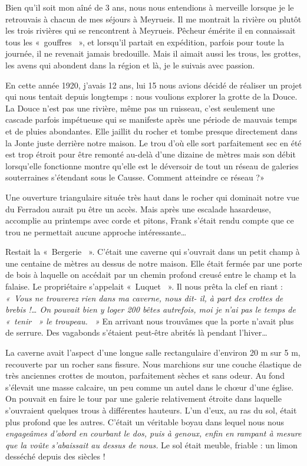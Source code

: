 Bien qu’il soit mon aîné de 3 ans, nous nous entendions à merveille lorsque je le retrouvais à
chacun de mes séjours à Meyrueis. Il me montrait la rivière ou plutôt les trois rivières qui se
rencontrent à Meyrueis.
Pêcheur émérite il en connaissait tous les «~gouffres ~», et lorsqu’il partait en expédition,
parfois pour toute la journée, il ne revenait jamais bredouille. Mais il aimait aussi les trous, les
grottes, les avens qui abondent dans la région et là, je le suivais avec passion.

En cette année 1920, j’avais 12 ans, lui 15 nous avions décidé de réaliser un projet qui nous
tentait depuis longtemps : nous voulions explorer la grotte de la Douce. La Douce n’est pas
une rivière, même pas un ruisseau, c’est seulement une cascade parfois impétueuse qui se
manifeste après une période de mauvais temps et de pluies abondantes. Elle jaillit du rocher et
tombe presque directement dans la Jonte juste derrière notre maison. Le trou d’où elle sort
parfaitement sec en été est trop étroit pour être remonté au-delà d’une dizaine de mètres mais
son débit lorsqu’elle fonctionne montre qu’elle est le déversoir de tout un réseau de galeries
souterraines s’étendant sous le Causse. Comment atteindre ce réseau ?»

Une ouverture triangulaire située très haut dans le rocher qui dominait notre vue du Ferradou
aurait pu être un accès. Mais après une escalade hasardeuse, accomplie au printemps avec
corde et pitons, Frank s’était rendu compte que ce trou ne permettait aucune approche
intéressante…

Restait la «~Bergerie ~». C’était une caverne qui s’ouvrait dans un petit champ à une centaine
de mètres au dessus de notre maison. Elle était fermée par une porte de bois à laquelle on
accédait par un chemin profond creusé entre le champ et la falaise. Le propriétaire s’appelait
«~Luquet ~». Il nous prêta la clef en riant : \textit{«~Vous ne trouverez rien dans ma caverne, nous dit-
il, à part des crottes de brebis !… On pouvait bien y loger 200 bêtes autrefois, moi je n’ai pas
le temps de «~tenir ~» le troupeau. ~»} En arrivant nous trouvâmes que la porte n’avait plus de
serrure. Des vagabonds s’étaient peut-être abrités là pendant l’hiver…

La caverne avait l’aspect d’une longue salle rectangulaire d’environ 20 m sur 5 m, recouverte par
un rocher sans fissure. Nous marchions sur une couche élastique de très anciennes crottes de
mouton, parfaitement sèches et sans odeur. Au fond s’élevait une masse calcaire, un peu
comme un autel dans le chœur d’une église.
On pouvait en faire le tour par une galerie relativement étroite dans laquelle s’ouvraient
quelques trous à différentes hauteurs. L’un d’eux, au ras du sol, était plus profond que les
autres. C’était un véritable boyau dans lequel nous nous \textit{engageâmes d’abord en courbant le dos,
puis à genoux, enfin en rampant à mesure que la voûte s’abaissait au dessus de nous.} Le sol
était meuble, friable : un limon desséché depuis des siècles !

